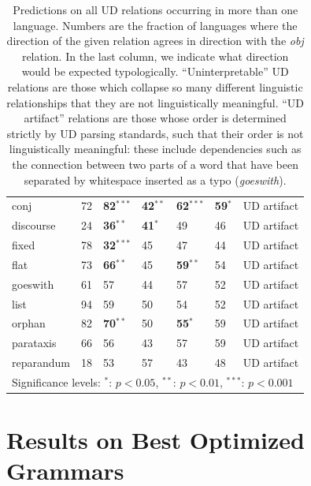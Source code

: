 \documentclass[12pt]{article}
\begin{document}
\begin{table}
\begin{center}
{\begin{tabular}{|l|l|l|ll|l|l|}
\hline
conj  &  72   &   \textbf{82}$^{***}$   &   \textbf{42}$^{**}$   &   \textbf{62}$^{***}$   &   \textbf{59}$^{*}$  & UD artifact  \\
discourse  &  24   &   \textbf{36}$^{**}$   &   \textbf{41}$^{*}$   &   49   &   46  & UD artifact   \\
fixed  &  78   &   \textbf{32}$^{***}$   &   45   &   47   &   44  & UD artifact   \\
flat  &  73   &   \textbf{66}$^{**}$   &   45   &   \textbf{59}$^{**}$   &   54  & UD artifact   \\
goeswith  &  61   &   57   &   44   &   57   &   52  & UD artifact   \\
list  &  94   &   59   &   50   &   54   &   52  & UD artifact  \\
orphan  &  82   &   \textbf{70}$^{**}$   &   50   &   \textbf{55}$^{*}$   &   59  & UD artifact   \\
parataxis  &  66   &   56   &   43   &   57   &   59  & UD artifact  \\
reparandum  &  18   &   53   &   57   &   43   &   48  & UD artifact  \\


 \hline
    \multicolumn{7}{l}{\footnotesize{Significance levels: $^*$: $p < 0.05$, $^{**}$: $p < 0.01$, $^{***}$: $p < 0.001$}}
\end{tabular}
}

\end{center}
\caption{Predictions on all UD relations occurring in more than one language. Numbers are the fraction of languages where the direction of the given relation agrees in direction with the \emph{obj} relation. In the last column, we indicate what direction would be expected typologically. ``Uninterpretable'' UD relations are those which collapse so many different linguistic relationships that they are not linguistically meaningful. ``UD artifact'' relations are those whose order is determined strictly by UD parsing standards, such that their order is not linguistically meaningful: these include dependencies such as the connection between two parts of a word that have been separated by whitespace inserted as a typo (\emph{goeswith}).}
\label{tab:all-predictions}
\end{table}

\section{Results on Best Optimized Grammars}
\end{document}
